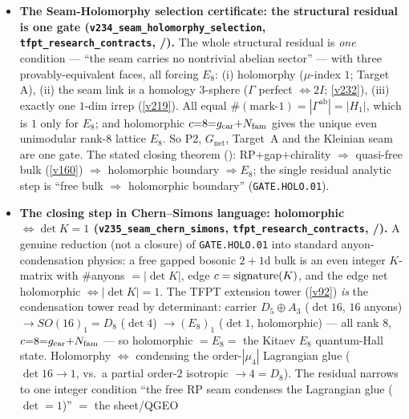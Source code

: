\begin{itemize}
  $\mu_6=\mu_3$(family/triality)$\times\mu_2$(sheet) factorisation: $\rho=\omega^2(-1)$ with $\omega=e^{2\pi i/3}$
  the $\Z_3$ triality centre (the $2/3$ cusp weight). Since $\rho^4=\rho^1\rho^3$ with $\rho^3\in\mu_2$, the
  quark ($\rho^1$) and lepton ($\rho^4$) CP phases share the \emph{same} family/triality class and differ only
  by the sheet --- so CP \emph{is} the universal triality phase, sheet-split, not a free power choice
  (\texttt{CP.TRIALITY.01}).
\item \textbf{The Seam-Holomorphy selection certificate: the structural residual is one gate
  (\texttt{v234\_seam\_holomorphy\_selection}, \texttt{tfpt\_research\_contracts}, \mE/\mO).} The whole
  structural residual is \emph{one} condition --- ``the seam carries no nontrivial abelian sector'' --- with
  three provably-equivalent faces, all forcing $E_8$: (i) holomorphy ($\mu$-index $1$; Target A), (ii) the
  seam link is a homology $3$-sphere ($\Gamma$ perfect $\Leftrightarrow2I$; \vref{v232}), (iii) exactly one
  $1$-dim irrep (\vref{v219}). All equal $\#(\text{mark-}1)=|\Gamma^{\mathrm{ab}}|=|H_1|$, which is $1$ only
  for $E_8$; and holomorphic $c{=}8{=}g_{\mathrm{car}}{+}N_{\mathrm{fam}}$ gives the unique even unimodular rank-$8$ lattice $E_8$.
  So P2, $G_{\mathrm{net}}$, Target~A and the Kleinian seam are one gate. The stated closing theorem
  (\mO): RP$+$gap$+$chirality $\Rightarrow$ quasi-free bulk (\vref{v160}) $\Rightarrow$ holomorphic boundary
  $\Rightarrow E_8$; the single residual analytic step is ``free bulk $\Rightarrow$ holomorphic boundary''
  (\texttt{GATE.HOLO.01}).
\item \textbf{The closing step in Chern--Simons language: holomorphic $\Leftrightarrow\det K{=}1$
  (\texttt{v235\_seam\_chern\_simons}, \texttt{tfpt\_research\_contracts}, \mE/\mO).} A genuine reduction
  (not a closure) of \texttt{GATE.HOLO.01} into standard anyon-condensation physics: a free gapped bosonic
  $2{+}1$d bulk is an even integer $K$-matrix with $\#$anyons $=|\det K|$, edge $c={\rm signature}(K)$, and
  the edge net holomorphic $\Leftrightarrow|\det K|{=}1$. The TFPT extension tower (\vref{v92}) \emph{is} the
  condensation tower read by determinant: carrier $D_5{\oplus}A_3$ ($\det16$, $16$ anyons) $\to SO(16)_1{=}D_8$
  ($\det4$) $\to(E_8)_1$ ($\det1$, holomorphic) --- all rank $8$, $c{=}8{=}g_{\mathrm{car}}{+}N_{\mathrm{fam}}$ --- so holomorphic
  $=E_8=$ the Kitaev $E_8$ quantum-Hall state. Holomorphy $\Leftrightarrow$ condensing the order-$|\mu_4|$
  Lagrangian glue ($\det16{\to}1$, vs.\ a partial order-$2$ isotropic $\to4{=}D_8$). The residual narrows to
  one integer condition ``the free RP seam condenses the Lagrangian glue ($\det{=}1$)'' $=$ the sheet/QGEO

\end{itemize}
